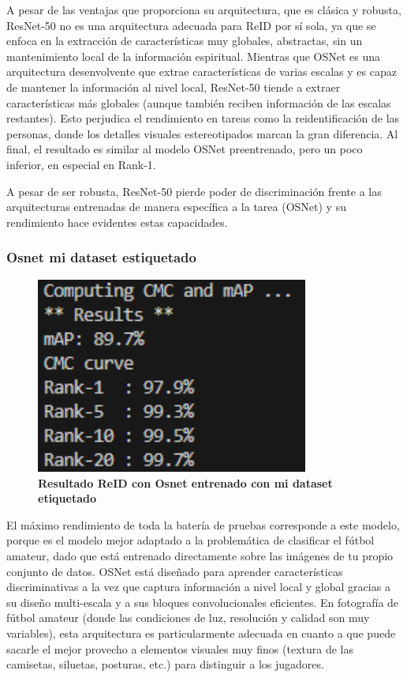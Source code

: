 \documentclass[12pt, a4paper, twoside]{article}
\begin{document}
 	A pesar de las ventajas que proporciona su arquitectura, que es clásica y robusta, ResNet-50 no es una arquitectura adecuada para ReID por sí sola, ya que se enfoca en la extracción de características muy globales, abstractas, sin un mantenimiento local de la información espiritual. Mientras que OSNet es una arquitectura desenvolvente que extrae características de varias escalas y es capaz de mantener la información al nivel local, ResNet-50 tiende a extraer características más globales (aunque también reciben información de las escalas restantes).
 	Esto perjudica el rendimiento en tareas como la reidentificación de las personas, donde los detalles visuales estereotipados marcan la gran diferencia. Al final, el resultado es similar al modelo OSNet preentrenado, pero un poco inferior, en especial en Rank-1.
 	
 	A pesar de ser robusta, ResNet-50 pierde poder de discriminación frente a las arquitecturas entrenadas de manera específica a la tarea (OSNet) y su rendimiento hace evidentes estas capacidades.
 	
 	\subsubsection{Osnet mi dataset estiquetado}
 	\begin{figure}[H]
 		\centering
 		\includegraphics[width=0.8\textwidth]{image/resultado_entrenamiento_reid_myData_osnet}
 		\caption{\textbf{Resultado ReID con Osnet entrenado con mi dataset etiquetado}}
 		\label{fig:Resultado  con Osnet reid mi dataset etiquetado osnet_x1_0}
 	\end{figure}
 	
 	El máximo rendimiento de toda la batería de pruebas corresponde a este modelo, porque es el modelo mejor adaptado a la problemática de clasificar el fútbol amateur, dado que está entrenado directamente sobre las imágenes de tu propio conjunto de datos.
 	OSNet está diseñado para aprender características discriminativas a la vez que captura información a nivel local y global gracias a su diseño multi-escala y a sus bloques convolucionales eficientes. En fotografía de fútbol amateur (donde las condiciones de luz, resolución y calidad son muy variables), esta arquitectura es particularmente adecuada en cuanto a que puede sacarle el mejor provecho a elementos visuales muy finos (textura de las camisetas, siluetas, posturas, etc.) para distinguir a los jugadores.
 	
\end{document}
